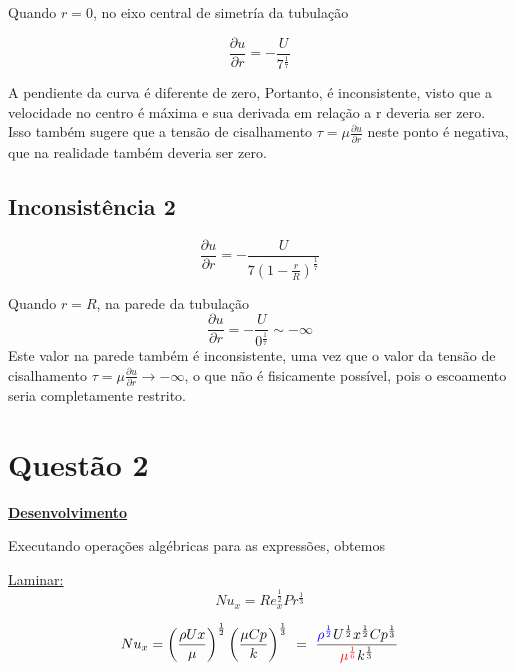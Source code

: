 \documentclass[12pt]{article}
\begin{document}
Quando $r = 0$, no eixo central de simetría da tubulação

\begin{equation}
	\frac{\partial u}{\partial r}  =  -\frac{U}   {7{}  ^\frac{1}{7}}
\end{equation}

A pendiente da curva é diferente de zero, Portanto, é inconsistente, visto que a velocidade no centro é máxima e sua derivada em relação a r deveria ser zero. Isso também sugere que a tensão de cisalhamento $\tau = \mu \frac{\partial u}{\partial r}$ neste ponto é negativa, que na realidade também deveria ser zero.

\subsection*{Inconsistência 2}

\begin{equation}
	\frac{\partial u}{\partial r}  =  -\frac{U}   {7(1-\frac{r}{R})  ^\frac{1}{7}}
\end{equation}

Quando $r = R$, na parede da tubulação
\begin{equation}
	\frac{\partial u}{\partial r}  =  -\frac{U}   {0{}  ^\frac{1}{7}} \sim -\infty
\end{equation}
Este valor na parede também é inconsistente, uma vez que o valor da tensão de cisalhamento $\tau = \mu \frac{\partial u}{\partial r} \rightarrow -\infty$, o que não é fisicamente possível, pois o escoamento seria completamente restrito.

\section*{Questão 2}

\textbf{\underline{Desenvolvimento}}

Executando operações algébricas para as expressões, obtemos

\underline{Laminar:}
\begin{equation}
	Nu_x= Re^\frac{1}{2}_x Pr^\frac{1}{3}	
\end{equation}

\begin{equation}
	Nu_x= \left( \frac{\rho U x}{\mu}\right)^\frac{1}{2}      \left( \frac{\mu Cp}{k}\right)^{\frac{1}{3}} \ = \ \frac{ \textcolor{blue}{\rho^\frac{1}{2}}  U^\frac{1}{2} x^\frac{1}{2}    Cp^\frac{1}{3}	}{ {\textcolor{red}{\mu^\frac{1}{6}}} k^\frac{1}{3}}
\end{equation}
\end{document}
